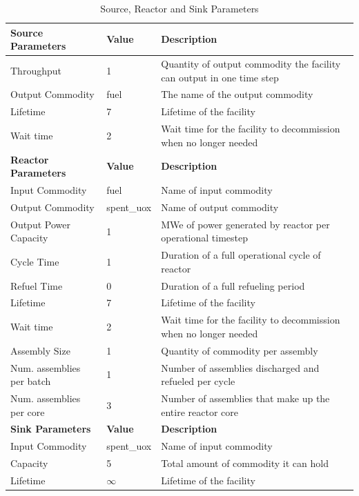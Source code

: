 \documentclass[11pt,letterpaper]{article}
\begin{document}
\begin{table}[H]
	\centering
    \caption {Source, Reactor and Sink Parameters}
	\label{tab:reactor}
	\begin{tabular}{|l|l|p{7cm}|}
\hline
\textbf{Source Parameters} & \textbf{Value} & \textbf{Description} \\
\hline
Throughput & 1 & Quantity of output commodity the facility can output in one time step \\
Output Commodity & fuel & The name of the output commodity\\
Lifetime & 7 & Lifetime of the facility \\
Wait time & 2 & Wait time for the facility to decommission when no longer needed \\
\hline
\textbf{Reactor Parameters} & \textbf{Value} & \textbf{Description} \\
\hline
Input Commodity & fuel & Name of input commodity\\
Output Commodity & spent\_uox & Name of output commodity\\

Output Power Capacity & 1& MWe of power generated by reactor per operational timestep\\
Cycle Time & 1 & Duration of a full operational cycle of reactor\\
Refuel Time & 0 & Duration of a full refueling period \\
Lifetime & 7 & Lifetime of the facility \\
Wait time & 2 & Wait time for the facility to decommission when no longer needed \\
Assembly Size & 1 & Quantity of commodity per assembly \\
Num. assemblies per batch & 1 & Number of assemblies discharged and refueled per cycle\\
Num. assemblies per core & 3 & Number of assemblies that make up the entire reactor core \\
\hline
\textbf{Sink Parameters} & \textbf{Value} & \textbf{Description} \\
\hline
Input Commodity & spent\_uox & Name of input commodity \\
Capacity & 5 & Total amount of commodity it can hold \\
Lifetime & $\infty$ & Lifetime of the facility \\
\hline
	\end{tabular}
\end{table}

\pagebreak
\end{document}
